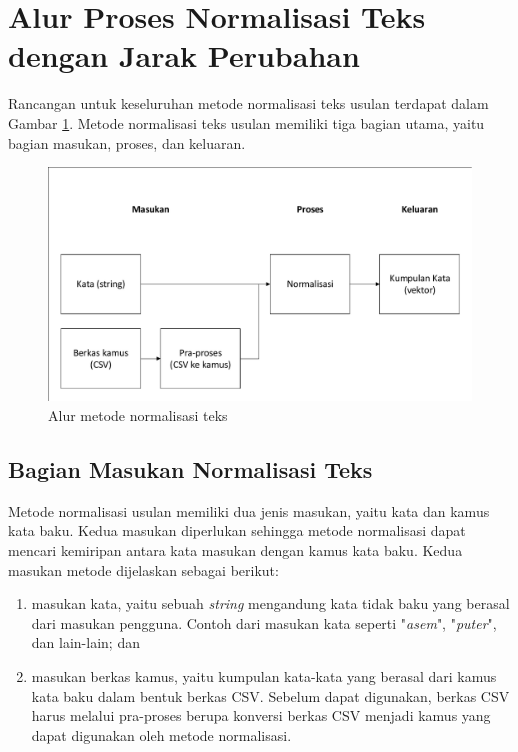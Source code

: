 \section{Alur Proses Normalisasi Teks dengan Jarak Perubahan}

Rancangan untuk keseluruhan metode normalisasi teks usulan terdapat dalam Gambar \ref{fig:ta_sistem}. Metode normalisasi teks usulan memiliki tiga bagian utama, yaitu bagian masukan, proses, dan keluaran.
\begin{figure}[ht]
	\centering
	\includegraphics[width=\textwidth, trim=2 2 2 2, clip]{resources/3/ta_sistem.pdf}
	\caption{Alur metode normalisasi teks}
	\label{fig:ta_sistem}
\end{figure}

\subsection{Bagian Masukan Normalisasi Teks}

Metode normalisasi usulan memiliki dua jenis masukan, yaitu kata dan kamus kata baku. Kedua masukan diperlukan sehingga metode normalisasi dapat mencari kemiripan antara kata masukan dengan kamus kata baku. Kedua masukan metode dijelaskan sebagai berikut:
\begin{enumerate}
	\item masukan kata, yaitu sebuah \textit{string} mengandung kata tidak baku yang berasal dari masukan pengguna. Contoh dari masukan kata seperti "\textit{asem}", "\textit{puter}", dan lain-lain; dan
	\item masukan berkas kamus, yaitu kumpulan kata-kata yang berasal dari kamus kata baku dalam bentuk berkas CSV. Sebelum dapat digunakan, berkas CSV harus melalui pra-proses berupa konversi berkas CSV menjadi kamus yang dapat digunakan oleh metode normalisasi.
\end{enumerate}

